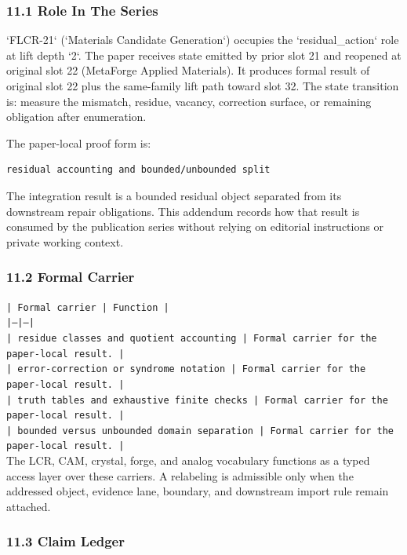 \documentclass[11pt]{article}
\begin{document}
\subsubsection*{11.1 Role In The Series}

`FLCR-21` (`Materials Candidate Generation`) occupies the `residual\_action` role at lift depth `2`.
The paper receives state emitted by prior slot 21 and reopened at original slot 22 (MetaForge Applied Materials). It produces formal result of original slot 22 plus the same-family lift path toward slot 32. The state transition is:
measure the mismatch, residue, vacancy, correction surface, or remaining obligation after enumeration.

The paper-local proof form is:

\begin{verbatim}
residual accounting and bounded/unbounded split
\end{verbatim}

The integration result is a bounded residual object separated from its downstream repair obligations. This addendum records how that result is
consumed by the publication series without relying on editorial instructions or
private working context.

\subsubsection*{11.2 Formal Carrier}

\noindent\texttt{| Formal carrier | Function |}\\
\noindent\texttt{|---|---|}\\
\noindent\texttt{| residue classes and quotient accounting | Formal carrier for the paper-local result. |}\\
\noindent\texttt{| error-correction or syndrome notation | Formal carrier for the paper-local result. |}\\
\noindent\texttt{| truth tables and exhaustive finite checks | Formal carrier for the paper-local result. |}\\
\noindent\texttt{| bounded versus unbounded domain separation | Formal carrier for the paper-local result. |}\\

The LCR, CAM, crystal, forge, and analog vocabulary functions as a typed access
layer over these carriers. A relabeling is admissible only when the addressed
object, evidence lane, boundary, and downstream import rule remain attached.

\subsubsection*{11.3 Claim Ledger}
\end{document}

